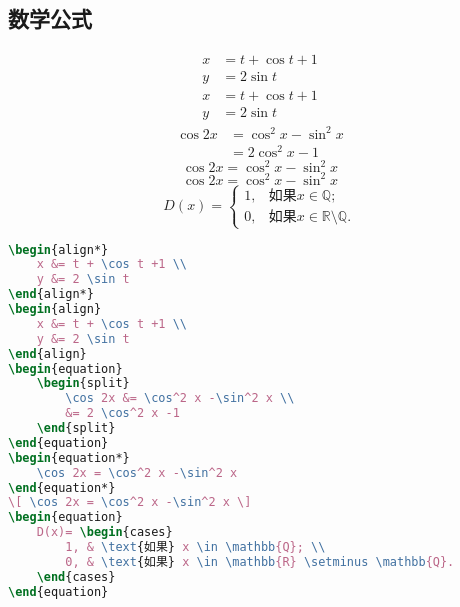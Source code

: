 \subsection{数学公式}
\begin{align*}
	x &= t + \cos t +1 \\
	y &= 2 \sin t
\end{align*}
\begin{align}
	x &= t + \cos t +1 \\
	y &= 2 \sin t
\end{align}
\begin{equation}\label{equ:1}
	\begin{split}
		\cos 2x &= \cos^2 x -\sin^2 x \\
		&= 2 \cos^2 x -1
	\end{split}
\end{equation}
\begin{equation*}
	\cos 2x = \cos^2 x -\sin^2 x 
\end{equation*}
\[ \cos 2x = \cos^2 x -\sin^2 x \]
\begin{equation}
D(x)= \begin{cases}
		1, & \text{如果} x \in \mathbb{Q}; \\
		0, & \text{如果} x \in \mathbb{R} \setminus \mathbb{Q}.
	\end{cases}
\end{equation}
\begin{lstlisting}[language=TeX]
\begin{align*}
	x &= t + \cos t +1 \\
	y &= 2 \sin t
\end{align*}
\begin{align}
	x &= t + \cos t +1 \\
	y &= 2 \sin t
\end{align}
\begin{equation}
	\begin{split}
		\cos 2x &= \cos^2 x -\sin^2 x \\
		&= 2 \cos^2 x -1
	\end{split}
\end{equation}
\begin{equation*}
	\cos 2x = \cos^2 x -\sin^2 x 
\end{equation*}
\[ \cos 2x = \cos^2 x -\sin^2 x \]
\begin{equation}
	D(x)= \begin{cases}
		1, & \text{如果} x \in \mathbb{Q}; \\
		0, & \text{如果} x \in \mathbb{R} \setminus \mathbb{Q}.
	\end{cases}
\end{equation}
\end{lstlisting}

